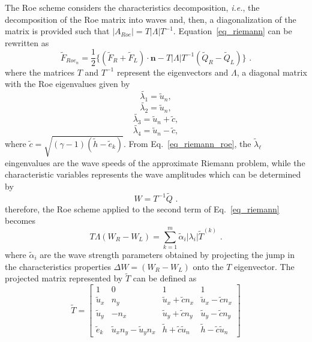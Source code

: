 The Roe scheme considers the characteristics decomposition, {\em i.e.}, the decomposition of the Roe matrix into waves and, then, a diagonalization of the matrix is provided such that $|A_{Roe}| = T|\Lambda|T^{-1}$. Equation\ \ref{eq_riemann} can be rewritten as
%
\begin{equation}
    \label{eq_riemann_roe}
    {\tilde{F}_{Roe_n}} = \frac{1}{2}\{(\tilde{F}_R + \tilde{F}_L) \cdot \textbf{n} - T|\Lambda| T^{-1} (\tilde{Q}_R - \tilde{Q}_L)\}
    \mbox{ .}
\end{equation}
where the matrices $T$ and $T^{-1}$ represent the eigenvectors and $\Lambda$, a diagonal matrix with the Roe eigenvalues given by
%
\begin{equation}
    \label{eq_roe_l1}
    \tilde{\lambda_{1}} = \tilde{u}_n ,
\end{equation}
%
\begin{equation}
    \label{eq_roe_l2}
    \tilde{\lambda_{2}} = \tilde{u}_n ,
\end{equation}
%
\begin{equation}
    \label{eq_roe_l3}
    \tilde{\lambda_{3}} = \tilde{u}_n +\tilde{c},
\end{equation}
%
\begin{equation}
    \label{eq_roe_l4}
    \tilde{\lambda_{4}} = \tilde{u}_n -\tilde{c},
\end{equation}
where $\tilde{c} = \sqrt{(\gamma-1)(\tilde{h}-\tilde{e}_k )}$. From Eq.\ \ref{eq_riemann_roe}, the $\tilde{\lambda}_{\ell}$ eingenvalues are the wave speeds of the approximate Riemann problem, while the characteristic variables represents the wave amplitudes which can be determined by 
%
\begin{equation}
    \label{eq_w_char_val}
    W = T^{-1}\tilde{Q}
    \mbox{ .}
\end{equation}
%
therefore, the Roe scheme applied to the second term of Eq.\ \ref{eq_riemann} becomes
%
\begin{equation}
    \label{eq_roe_piece}
    T\Lambda (W_R - W_L) = \sum_{k=1}^{m}{\tilde{\alpha}_i |\lambda_i|\tilde{T}^{(k)}}
    \mbox{ .}
\end{equation}
%
where $\tilde{\alpha}_i$ are the wave strength parameters obtained by projecting the jump in the characteristics properties $\Delta W = (W_R - W_L)$ onto the $T$ eigenvector. The projected matrix represented by $\tilde{T}$ can be defined as
\begin{equation}
    \label{eq_t_projected}
	\tilde{T} = 
\begin{bmatrix}
    1 & 0 & 1 & 1\\
    \tilde{u}_x & n_y & \tilde{u}_x + \tilde{c}n_x & \tilde{u}_x-\tilde{c}n_x\\
    \tilde{u}_y & -n_x & \tilde{u}_y + \tilde{c}n_y & \tilde{u}_y-\tilde{c}n_y\\
    \tilde{e}_k & \tilde{u}_x n_y - \tilde{u}_y n_x & \tilde{h} + \tilde{c}\tilde{u}_n & \tilde{h} - \tilde{c}\tilde{u}_n
\end{bmatrix}     
\end{equation}

